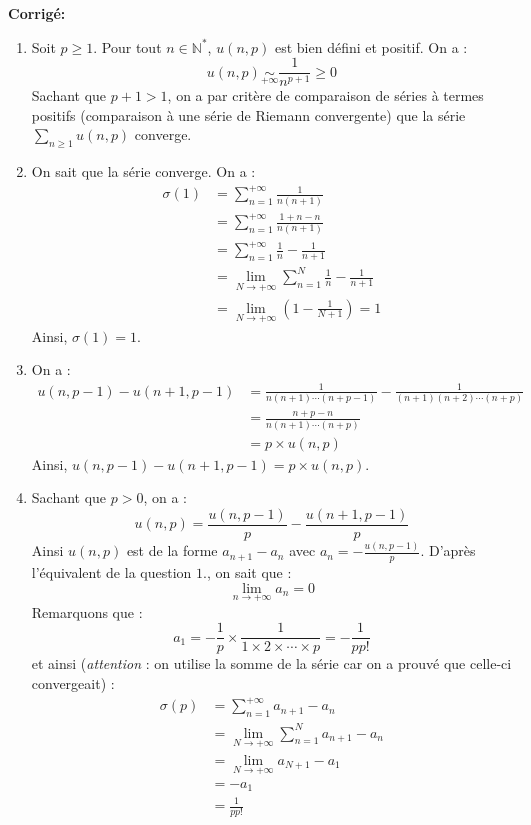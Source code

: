 \documentclass[a4paper,twoside,french,10pt]{VcCours}
\newcommand{\corr}{\textbf{Corrigé:}}
\begin{document}
\corr \begin{enumerate}
\item Soit $p \geq 1$. Pour tout $n \in \mathbb{N}^*$, $u(n,p)$ est bien défini et positif. On a :
$$u(n,p) \underset{+\infty}{\sim} \frac{1}{n^{p+1}} \geq 0$$
Sachant que $p+1>1$, on a par critère de comparaison de séries à termes positifs (comparaison à une série de Riemann convergente) que la série $\sum_{n \geq 1} u(n,p)$ converge.

\item  On sait que la série converge. On a : 
\begin{align*}
\sigma (1)& =\sum_{n=1}^{+\infty }\frac{1}{n(n+1)} \\
& =\sum_{n=1}^{+\infty }\frac{1+n-n}{n(n+1)} \\
& =\sum_{n=1}^{+\infty }\frac{1}{n}-\frac{1}{n+1} \\
& = \lim_{N \rightarrow + \infty} \sum_{n=1}^{N}\frac{1}{n}-\frac{1}{n+1} \\
& =\lim_{N \rightarrow +\infty }\left(1- \frac{1}{N+1}\right) =1 
\end{align*}
Ainsi, $\sigma(1)=1$.
\item On a :
\begin{align*}
u(n,p-1)-u(n+1,p-1) & =\frac{1}{n(n+1)\cdots (n+p-1)}-\frac{1}{(n+1)(n+2)\cdots
(n+p)} \\
& =\frac{n+p-n}{n(n+1)\cdots (n+p)} \\
& =p \times u(n,p) 
\end{align*}
Ainsi, $u(n,p-1)-u(n+1,p-1)=p \times u(n,p)$.
\item Sachant que $p>0$, on a :
\[
u(n,p)=\frac{u(n,p-1)}{p}-\frac{u(n+1,p-1)}{p} 
\]
Ainsi $u(n,p)$ est de la forme $a_{n+1}-a_n$ avec $ a_n=-\frac{u(n,p-1)}{p}$. D'apr\`es l'équivalent de la question $1.$,  on sait que :
$$\lim_{n \rightarrow + \infty} a_{n}=0$$
Remarquons que : 
$$a_{1}=-\frac{1}{p} \times \frac{1}{1 \times 2 \times \cdots \times p}=-\frac{1}{pp!}$$ 
et ainsi (\textit{attention} : on utilise la somme de la série car on a prouvé que celle-ci convergeait) :
\begin{align*}
\sigma(p) & = \sum_{n=1}^{+ \infty} a_{n+1}-a_n \\
& = \lim_{N \rightarrow + \infty}  \sum_{n=1}^{N} a_{n+1}-a_n \\
& = \lim_{N \rightarrow + \infty} a_{N+1} - a_1 \\
& = - a_1 \\
& = \frac{1}{pp!} 
\end{align*}
\end{enumerate}
\end{document}
